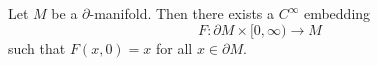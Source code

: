 Let $M$ be a $\partial$-manifold. Then there exists a $C^\infty$ embedding
$$F: \partial M \times [0, \infty) \to M$$
such that $F(x, 0) = x$ for all $x \in \partial M$.
